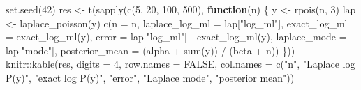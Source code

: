 \documentclass[
  letterpaper,
  DIV=11,
  numbers=noendperiod]{scrreprt}
\newenvironment{Shaded}{\begin{snugshade}}{\end{snugshade}}
\newcommand{\AttributeTok}[1]{\textcolor[rgb]{0.40,0.45,0.13}{#1}}
\newcommand{\ConstantTok}[1]{\textcolor[rgb]{0.56,0.35,0.01}{#1}}
\newcommand{\ControlFlowTok}[1]{\textcolor[rgb]{0.00,0.23,0.31}{\textbf{#1}}}
\newcommand{\DecValTok}[1]{\textcolor[rgb]{0.68,0.00,0.00}{#1}}
\newcommand{\FunctionTok}[1]{\textcolor[rgb]{0.28,0.35,0.67}{#1}}
\newcommand{\NormalTok}[1]{\textcolor[rgb]{0.00,0.23,0.31}{#1}}
\newcommand{\OtherTok}[1]{\textcolor[rgb]{0.00,0.23,0.31}{#1}}
\newcommand{\SpecialCharTok}[1]{\textcolor[rgb]{0.37,0.37,0.37}{#1}}
\newcommand{\StringTok}[1]{\textcolor[rgb]{0.13,0.47,0.30}{#1}}
\begin{document}
\begin{Shaded}
\begin{Highlighting}[]
\FunctionTok{set.seed}\NormalTok{(}\DecValTok{42}\NormalTok{)}
\NormalTok{res }\OtherTok{\textless{}{-}} \FunctionTok{t}\NormalTok{(}\FunctionTok{sapply}\NormalTok{(}\FunctionTok{c}\NormalTok{(}\DecValTok{5}\NormalTok{, }\DecValTok{20}\NormalTok{, }\DecValTok{100}\NormalTok{, }\DecValTok{500}\NormalTok{), }\ControlFlowTok{function}\NormalTok{(n) \{}
\NormalTok{  y }\OtherTok{\textless{}{-}} \FunctionTok{rpois}\NormalTok{(n, }\DecValTok{3}\NormalTok{)}
\NormalTok{  lap }\OtherTok{\textless{}{-}} \FunctionTok{laplace\_poisson}\NormalTok{(y)}
  \FunctionTok{c}\NormalTok{(}\AttributeTok{n =}\NormalTok{ n, }\AttributeTok{laplace\_log\_ml =}\NormalTok{ lap[}\StringTok{"log\_ml"}\NormalTok{], }\AttributeTok{exact\_log\_ml =} \FunctionTok{exact\_log\_ml}\NormalTok{(y),}
    \AttributeTok{error =}\NormalTok{ lap[}\StringTok{"log\_ml"}\NormalTok{] }\SpecialCharTok{{-}} \FunctionTok{exact\_log\_ml}\NormalTok{(y),}
    \AttributeTok{laplace\_mode =}\NormalTok{ lap[}\StringTok{"mode"}\NormalTok{], }\AttributeTok{posterior\_mean =}\NormalTok{ (alpha }\SpecialCharTok{+} \FunctionTok{sum}\NormalTok{(y)) }\SpecialCharTok{/}\NormalTok{ (beta }\SpecialCharTok{+}\NormalTok{ n))}
\NormalTok{\}))}
\NormalTok{knitr}\SpecialCharTok{::}\FunctionTok{kable}\NormalTok{(res, }\AttributeTok{digits =} \DecValTok{4}\NormalTok{, }\AttributeTok{row.names =} \ConstantTok{FALSE}\NormalTok{,}
             \AttributeTok{col.names =} \FunctionTok{c}\NormalTok{(}\StringTok{"n"}\NormalTok{, }\StringTok{"Laplace log P(y)"}\NormalTok{, }\StringTok{"exact log P(y)"}\NormalTok{, }\StringTok{"error"}\NormalTok{,}
                           \StringTok{"Laplace mode"}\NormalTok{, }\StringTok{"posterior mean"}\NormalTok{))}
\end{Highlighting}
\end{Shaded}
\end{document}
